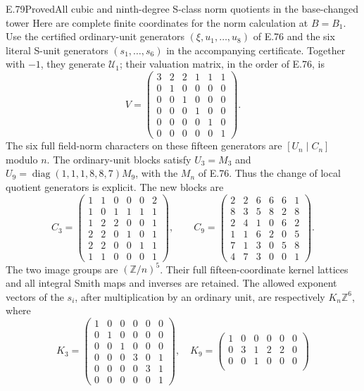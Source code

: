 \begin{statement}{E.79}{Proved}{All cubic and ninth-degree S-class norm quotients in the base-changed tower}
Here are complete finite coordinates for the norm calculation at
$B=B_1$. Use the certified ordinary-unit generators
$(\xi,u_1,\ldots,u_8)$ of E.76 and the six literal S-unit
generators $(s_1,\ldots,s_6)$ in the accompanying certificate.
Together with $-1$, they generate $\mathscr U_1$; their valuation
matrix, in the order of E.76, is
\[
 V=\begin{pmatrix}
 3&2&2&1&1&1\\0&1&0&0&0&0\\0&0&1&0&0&0\\
 0&0&0&1&0&0\\0&0&0&0&1&0\\0&0&0&0&0&1
 \end{pmatrix}.
 \tag{E79.5}
\]
The six full field-norm characters on these fifteen generators
are $[U_n\mid C_n]$ modulo $n$. The ordinary-unit blocks satisfy
$U_3=M_3$ and
$U_9=\operatorname{diag}(1,1,1,8,8,7)M_9$, with the $M_n$
of E.76. Thus the change of local quotient generators is explicit.
The new blocks are
\[
 C_3=\begin{pmatrix}
 1&1&0&0&0&2\\1&0&1&1&1&1\\1&2&2&0&0&1\\
 2&2&0&1&0&1\\2&2&0&0&1&1\\1&1&0&0&0&1
 \end{pmatrix},\qquad
 C_9=\begin{pmatrix}
 2&2&6&6&6&1\\8&3&5&8&2&8\\2&4&1&0&6&2\\
 1&1&6&2&0&5\\7&1&3&0&5&8\\4&7&3&0&0&1
 \end{pmatrix}.
 \tag{E79.6}
\]
The two image groups are $(\mathbb Z/n)^5$. Their full
fifteen-coordinate kernel lattices and all integral Smith maps
and inverses are retained. The allowed exponent vectors of the
$s_i$, after multiplication by an ordinary unit, are respectively
$K_n\mathbb Z^6$, where
\[
 K_3=\begin{pmatrix}
 1&0&0&0&0&0\\0&1&0&0&0&0\\0&0&1&0&0&0\\
 0&0&0&3&0&1\\0&0&0&0&3&1\\0&0&0&0&0&1
 \end{pmatrix},\quad
 K_9=\begin{pmatrix}
 1&0&0&0&0&0\\0&3&1&2&2&0\\0&0&1&0&0&0\\

\end{pmatrix}\]
\end{statement}
